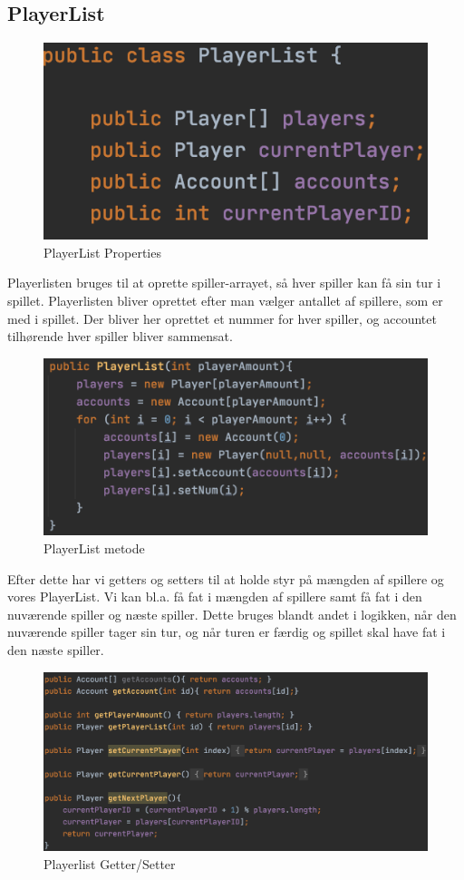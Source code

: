 \subsection{PlayerList}

\begin{figure}[H]
    \centering
    \includegraphics[width=\textwidth]{sources/7_implementering/PlayerList Properties.png}
    \caption{PlayerList Properties}
    \label{fig:plProps}
\end{figure}
Playerlisten bruges til at oprette spiller-arrayet, så hver spiller kan få sin tur i spillet. Playerlisten bliver oprettet efter man vælger antallet af spillere, som er med i spillet. Der bliver her oprettet et nummer for hver spiller, og accountet tilhørende hver spiller bliver sammensat.
\begin{figure}[H]
    \centering
    \includegraphics[width=\textwidth]{sources/7_implementering/PlayerList PlayerList.png}
    \caption{PlayerList metode}
    \label{fig:plMetode}
\end{figure}
Efter dette har vi getters og setters til at holde styr på mængden af spillere og vores PlayerList. Vi kan bl.a. få fat i mængden af spillere samt få fat i den nuværende spiller og næste spiller. Dette bruges blandt andet i logikken, når den nuværende spiller tager sin tur, og når turen er færdig og spillet skal have fat i den næste spiller.
\begin{figure}[H]
    \centering
    \includegraphics[width=\textwidth]{sources/7_implementering/PlayerList Getters Setters.png}
    \caption{Playerlist Getter/Setter}
    \label{fig:plGetSet}
\end{figure}